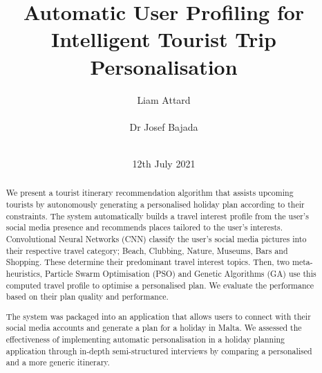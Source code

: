 \documentclass{sig-alternate}
\begin{document}
\title{Automatic User Proﬁling for Intelligent
Tourist Trip Personalisation}
\author{
\alignauthor
Liam Attard\\
       \\
\alignauthor
Dr Josef Bajada\\
       \\
}

\date{12th July 2021}

\makeatletter
\def\@copyrightspace{\relax}
\makeatother

\maketitle
\begin{abstract}

We present a tourist itinerary recommendation
algorithm that assists upcoming tourists by
autonomously generating a personalised holiday plan
according to their constraints. The system
automatically builds a travel interest profile from
the user's social media presence and recommends places
tailored to the user's interests.  Convolutional
Neural Networks (CNN) classify the user's social media
pictures into their respective travel category; Beach,
Clubbing, Nature, Museums, Bars and Shopping. These
determine their predominant travel interest topics.
Then, two meta-heuristics, Particle Swarm
Optimisation (PSO) and Genetic Algorithms (GA) use this
computed travel profile to optimise a personalised
plan. We evaluate the performance based on their plan
quality and performance.

The system was packaged into an application that
allows users to connect with their social media
accounts and generate a plan for a holiday in Malta.
We assessed the effectiveness of implementing
automatic personalisation in a holiday planning
application through in-depth semi-structured
interviews by comparing a personalised and a more
generic itinerary.


\end{abstract}
















\end{document}
